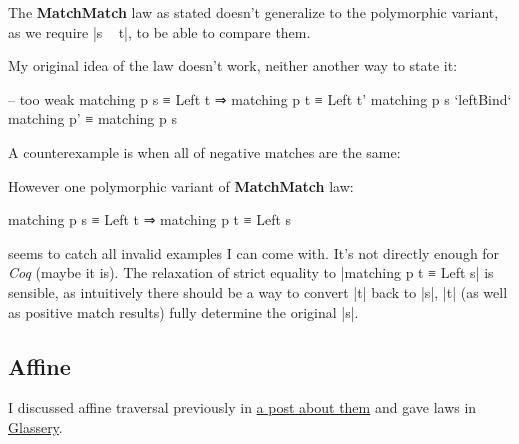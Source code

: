 \documentclass{article}
\begin{document}
The \textbf{MatchMatch} law as stated doesn't generalize to the
polymorphic variant, as we require |s ~ t|, to be able to compare them.

My original idea of the law doesn't work, neither another way to state it:

\begin{code}
-- too weak
matching p s ≡ Left t ⇒ matching p t ≡ Left t'
matching p s `leftBind` matching p' ≡ matching p s
\end{code}

A counterexample is when all of negative matches are the same:


However one polymorphic variant of \textbf{MatchMatch} law:

\begin{code}
matching p s ≡ Left t ⇒ matching p t ≡ Left s
\end{code}

seems to catch all invalid examples I can come with.
It's not directly enough for \emph{Coq} (maybe it is).
The relaxation of strict equality to |matching p t ≡ Left s| is sensible,
as intuitively there should be a way to convert |t| back to |s|,
|t| (as well as positive match results) fully determine the original |s|.

\subsection{Affine}

 I discussed affine traversal previously in
\href{2017-03-20-affine-traversal.html}{a post about them}
and gave laws in
\href{2017-04-18-glassery.html#laws:affine-traversal}{Glassery}.

\end{document}
